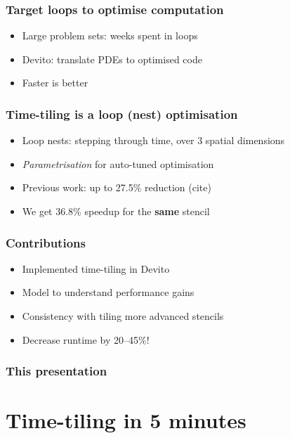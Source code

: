 \documentclass{beamer}
\begin{document}
\begin{frame}
\frametitle{Target loops to optimise computation}

\begin{itemize}
	\item Large problem sets: weeks spent in loops
	\item Devito: translate PDEs to optimised code
	\item Faster is better
\end{itemize}
\end{frame}



\begin{frame}
\frametitle{Time-tiling is a loop (nest) optimisation}

\begin{itemize}
	\item Loop nests: stepping through time, over 3 spatial dimensions
	\item \emph{Parametrisation} for auto-tuned optimisation
	\item Previous work: up to 27.5\% reduction (cite)
	\item We get 36.8\% speedup for the \textbf{same} stencil
\end{itemize}
\end{frame}



\begin{frame}
\frametitle{Contributions}

\begin{itemize}
	\item Implemented time-tiling in Devito
	\item Model to understand performance gains
	\item Consistency with tiling more advanced stencils
	\item Decrease runtime by 20--45\%!
\end{itemize}
\end{frame}



\begin{frame}
\frametitle{This presentation}
\tableofcontents
\end{frame}



\section{Time-tiling in 5 minutes}
\end{document}
